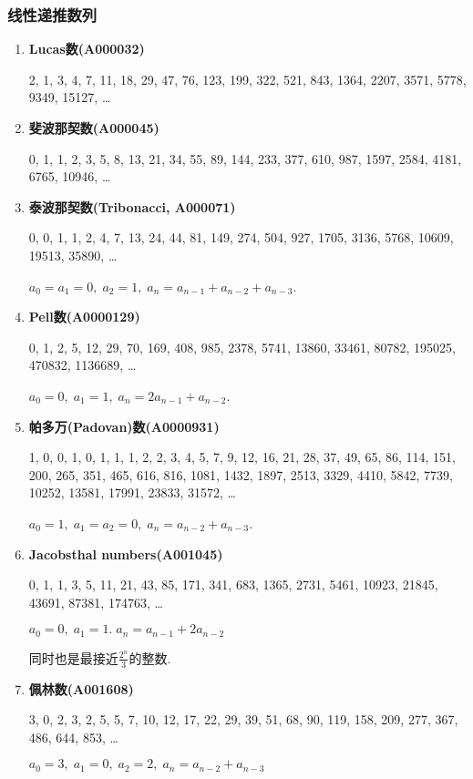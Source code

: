 \subsubsection{线性递推数列}

\begin{enumerate}

\item \textbf{Lucas数(A000032)}

2, 1, 3, 4, 7, 11, 18, 29, 47, 76, 123, 199, 322, 521, 843, 1364, 2207, 3571, 5778, 9349, 15127, \dots

\item \textbf{斐波那契数(A000045)}

0, 1, 1, 2, 3, 5, 8, 13, 21, 34, 55, 89, 144, 233, 377, 610, 987, 1597, 2584, 4181, 6765, 10946, \dots

\item \textbf{泰波那契数(Tribonacci, A000071)}

0, 0, 1, 1, 2, 4, 7, 13, 24, 44, 81, 149, 274, 504, 927, 1705, 3136, 5768, 10609, 19513, 35890, \dots

$ a_0 = a_1 = 0,\; a_2 = 1,\; a_n = a_{n - 1} + a_{n - 2} + a_{n - 3} $.

\item \textbf{Pell数(A0000129)}

0, 1, 2, 5, 12, 29, 70, 169, 408, 985, 2378, 5741, 13860, 33461, 80782, 195025, 470832, 1136689, \dots

$ a_0 = 0,\; a_1 = 1,\; a_n = 2a_{n - 1} + a_{n - 2} $.

\item \textbf{帕多万(Padovan)数(A0000931)}

1, 0, 0, 1, 0, 1, 1, 1, 2, 2, 3, 4, 5, 7, 9, 12, 16, 21, 28, 37, 49, 65, 86, 114, 151, 200, 265, 351, 465, 616, 816, 1081, 1432, 1897, 2513, 3329, 4410, 5842, 7739, 10252, 13581, 17991, 23833, 31572, \dots

$a_0 = 1,\; a_1 = a_2 = 0,\; a_n = a_{n - 2} + a_{n - 3}$.

\item \textbf{Jacobsthal numbers(A001045)}

0, 1, 1, 3, 5, 11, 21, 43, 85, 171, 341, 683, 1365, 2731, 5461, 10923, 21845, 43691, 87381, 174763, \dots

$ a_0 = 0,\; a_1 = 1.\; a_n = a_{n - 1} + 2a_{n - 2} $

同时也是最接近$\frac {2 ^ n} 3$的整数.

\item \textbf{佩林数(A001608)}

3, 0, 2, 3, 2, 5, 5, 7, 10, 12, 17, 22, 29, 39, 51, 68, 90, 119, 158, 209, 277, 367, 486, 644, 853, \dots

$ a_0 = 3,\; a_1 = 0,\; a_2 = 2,\; a_n = a_{n - 2} + a_{n - 3} $

\end{enumerate}

